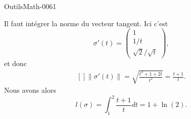 
\begin{corrige}{OutilsMath-0061}

    Il faut intégrer la norme du vecteur tangent. Ici c'est
    \begin{equation}
        \sigma'(t)=\begin{pmatrix}
            1    \\ 
            1/t    \\ 
            \sqrt{2}/\sqrt{t}    
        \end{pmatrix},
    \end{equation}
    et donc
    \begin{equation}
        \begin{aligned}[]
            \| \sigma'(t) \|=\sqrt{\frac{ t^2+1+2t }{ t^2 }}=\frac{ t+1 }{ t }.
        \end{aligned}
    \end{equation}
    Nous avons alors
    \begin{equation}
        l(\sigma)=\int_1^2\frac{ t+1 }{ t }dt=1+\ln(2).
    \end{equation}

\end{corrige}
